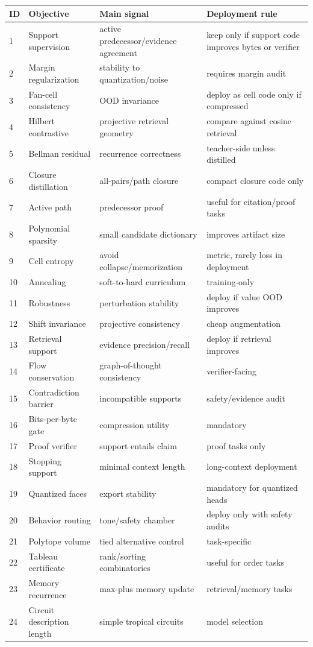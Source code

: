 \documentclass[11pt]{article}
\begin{document}
\begin{longtable}{p{}p{}p{}p{}}
\toprule
ID & Objective & Main signal & Deployment rule\\
\midrule
1 & Support supervision & active predecessor/evidence agreement & keep only if support code improves bytes or verifier\\
2 & Margin regularization & stability to quantization/noise & requires margin audit\\
3 & Fan-cell consistency & OOD invariance & deploy as cell code only if compressed\\
4 & Hilbert contrastive & projective retrieval geometry & compare against cosine retrieval\\
5 & Bellman residual & recurrence correctness & teacher-side unless distilled\\
6 & Closure distillation & all-pairs/path closure & compact closure code only\\
7 & Active path & predecessor proof & useful for citation/proof tasks\\
8 & Polynomial sparsity & small candidate dictionary & improves artifact size\\
9 & Cell entropy & avoid collapse/memorization & metric, rarely loss in deployment\\
10 & Annealing & soft-to-hard curriculum & training-only\\
11 & Robustness & perturbation stability & deploy if value OOD improves\\
12 & Shift invariance & projective consistency & cheap augmentation\\
13 & Retrieval support & evidence precision/recall & deploy if retrieval improves\\
14 & Flow conservation & graph-of-thought consistency & verifier-facing\\
15 & Contradiction barrier & incompatible supports & safety/evidence audit\\
16 & Bits-per-byte gate & compression utility & mandatory\\
17 & Proof verifier & support entails claim & proof tasks only\\
18 & Stopping support & minimal context length & long-context deployment\\
19 & Quantized faces & export stability & mandatory for quantized heads\\
20 & Behavior routing & tone/safety chamber & deploy only with safety audits\\
21 & Polytope volume & tied alternative control & task-specific\\
22 & Tableau certificate & rank/sorting combinatorics & useful for order tasks\\
23 & Memory recurrence & max-plus memory update & retrieval/memory tasks\\
24 & Circuit description length & simple tropical circuits & model selection\\
\bottomrule
\end{longtable}
\end{document}
